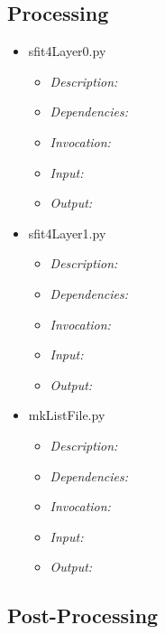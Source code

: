 \documentclass[12pt, letterpaper]{article}
\begin{document}
\subsection{Processing}
\begin{itemize}
\item sfit4Layer0.py
\begin{itemize}
\item \textit{Description:} 
\item \textit{Dependencies:} 
\item \textit{Invocation:} 
\item \textit{Input:} 
\item \textit{Output:}
\end{itemize}
\end{itemize}


\begin{itemize}
\item sfit4Layer1.py
\begin{itemize}
\item \textit{Description:} 
\item \textit{Dependencies:} 
\item \textit{Invocation:} 
\item \textit{Input:} 
\item \textit{Output:}
\end{itemize}
\end{itemize}


\begin{itemize}
\item mkListFile.py
\begin{itemize}
\item \textit{Description:} 
\item \textit{Dependencies:} 
\item \textit{Invocation:} 
\item \textit{Input:} 
\item \textit{Output:}
\end{itemize}
\end{itemize}


\subsection{Post-Processing}
\end{document}

